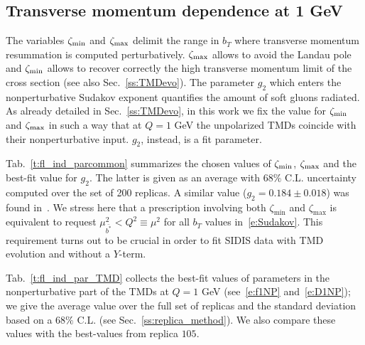 \documentclass[aps,preprintnumbers,showpacs,nofootinbib,superscriptaddress,floatfix]{revtex4}
\newcommand{\bb}{\zeta}
\begin{document}
\subsection{Transverse momentum dependence at 1 GeV}
\label{ss:bestfit_TMDs}

The variables $\bb_{\rm min}$ and $\bb_{\rm max}$ delimit the range in $b_T$ where transverse momentum resummation is computed perturbatively. $\bb_{\rm max}$ allows to avoid the Landau pole and $\bb_{\rm min}$ allows to recover correctly the high transverse momentum limit of the cross section (see also Sec.~\ref{ss:TMDevo}).
The parameter $g_2$ which enters the nonperturbative Sudakov exponent quantifies the amount of soft gluons radiated.
As already detailed in Sec.~\ref{ss:TMDevo}, in this work we fix the value for $\bb_{\rm min}$ and $\bb_{\rm max}$ in such a way that at $Q=1$ GeV the unpolarized TMDs coincide with their nonperturbative input. $g_2$, instead, is a fit parameter.

Tab.~\ref{t:fl_ind_parcommon} summarizes the chosen values of $\bb_{\rm min}$, $\bb_{\rm max}$ and the best-fit value for $g_2$. The latter is given as an average with $68\%$ C.L. uncertainty computed over the set of 200 replicas. A similar value ($g_2 = 0.184 \pm 0.018$) was found in~\cite{Konychev:2005iy}.
We stress here that a prescription involving both $\bb_{\text{min}}$ and $\bb_{\text{max}}$ is equivalent to request $\mu_{\bar{b^*}}^2 < Q^2 \equiv \mu^2$ for all $b_T$ values in~\eqref{e:Sudakov}. This requirement turns out to be crucial in order to fit SIDIS data with TMD evolution and without a $Y$-term.

Tab.~\ref{t:fl_ind_par_TMD} collects the best-fit values of parameters in the nonperturbative part of the TMDs at $Q=1$ GeV (see~\eqref{e:f1NP} and~\eqref{e:D1NP}); we give the average value over the full set of replicas and the standard deviation based on a $68\%$ C.L. (see Sec.~\ref{ss:replica_method}). 
We also compare these values with the best-values from replica $105$.
\end{document}
